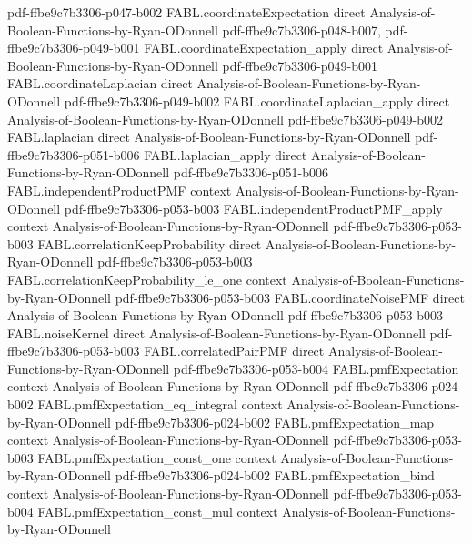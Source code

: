 \begin{theorem}
  {pdf-ffbe9c7b3306-p047-b002}
\proofstep
  {FABL.coordinateExpectation}
  {direct}
  {Analysis-of-Boolean-Functions-by-Ryan-ODonnell}
  {pdf-ffbe9c7b3306-p048-b007,
    pdf-ffbe9c7b3306-p049-b001}
\proofstep
  {FABL.coordinateExpectation_apply}
  {direct}
  {Analysis-of-Boolean-Functions-by-Ryan-ODonnell}
  {pdf-ffbe9c7b3306-p049-b001}
\proofstep
  {FABL.coordinateLaplacian}
  {direct}
  {Analysis-of-Boolean-Functions-by-Ryan-ODonnell}
  {pdf-ffbe9c7b3306-p049-b002}
\proofstep
  {FABL.coordinateLaplacian_apply}
  {direct}
  {Analysis-of-Boolean-Functions-by-Ryan-ODonnell}
  {pdf-ffbe9c7b3306-p049-b002}
\proofstep
  {FABL.laplacian}
  {direct}
  {Analysis-of-Boolean-Functions-by-Ryan-ODonnell}
  {pdf-ffbe9c7b3306-p051-b006}
\proofstep
  {FABL.laplacian_apply}
  {direct}
  {Analysis-of-Boolean-Functions-by-Ryan-ODonnell}
  {pdf-ffbe9c7b3306-p051-b006}
\proofstep
  {FABL.independentProductPMF}
  {context}
  {Analysis-of-Boolean-Functions-by-Ryan-ODonnell}
  {pdf-ffbe9c7b3306-p053-b003}
\proofstep
  {FABL.independentProductPMF_apply}
  {context}
  {Analysis-of-Boolean-Functions-by-Ryan-ODonnell}
  {pdf-ffbe9c7b3306-p053-b003}
\proofstep
  {FABL.correlationKeepProbability}
  {direct}
  {Analysis-of-Boolean-Functions-by-Ryan-ODonnell}
  {pdf-ffbe9c7b3306-p053-b003}
\proofstep
  {FABL.correlationKeepProbability_le_one}
  {context}
  {Analysis-of-Boolean-Functions-by-Ryan-ODonnell}
  {pdf-ffbe9c7b3306-p053-b003}
\proofstep
  {FABL.coordinateNoisePMF}
  {direct}
  {Analysis-of-Boolean-Functions-by-Ryan-ODonnell}
  {pdf-ffbe9c7b3306-p053-b003}
\proofstep
  {FABL.noiseKernel}
  {direct}
  {Analysis-of-Boolean-Functions-by-Ryan-ODonnell}
  {pdf-ffbe9c7b3306-p053-b003}
\proofstep
  {FABL.correlatedPairPMF}
  {direct}
  {Analysis-of-Boolean-Functions-by-Ryan-ODonnell}
  {pdf-ffbe9c7b3306-p053-b004}
\proofstep
  {FABL.pmfExpectation}
  {context}
  {Analysis-of-Boolean-Functions-by-Ryan-ODonnell}
  {pdf-ffbe9c7b3306-p024-b002}
\proofstep
  {FABL.pmfExpectation_eq_integral}
  {context}
  {Analysis-of-Boolean-Functions-by-Ryan-ODonnell}
  {pdf-ffbe9c7b3306-p024-b002}
\proofstep
  {FABL.pmfExpectation_map}
  {context}
  {Analysis-of-Boolean-Functions-by-Ryan-ODonnell}
  {pdf-ffbe9c7b3306-p053-b003}
\proofstep
  {FABL.pmfExpectation_const_one}
  {context}
  {Analysis-of-Boolean-Functions-by-Ryan-ODonnell}
  {pdf-ffbe9c7b3306-p024-b002}
\proofstep
  {FABL.pmfExpectation_bind}
  {context}
  {Analysis-of-Boolean-Functions-by-Ryan-ODonnell}
  {pdf-ffbe9c7b3306-p053-b004}
\proofstep
  {FABL.pmfExpectation_const_mul}
  {context}
  {Analysis-of-Boolean-Functions-by-Ryan-ODonnell}

\end{theorem}
